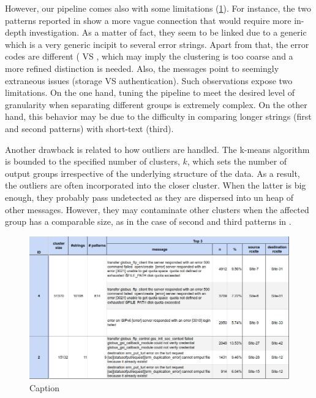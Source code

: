 However, our pipeline comes also with some limitations (\cref{fig:cluster_summary:failures}). 
For instance, the two patterns reported in  show a more vague connection that would require more in-depth investigation.
As a matter of fact, they seem to be linked due to a generic  which is a very generic incipit to several error strings. Apart from that, the error codes are different (\textbox{[3021]} VS \textbox{[3010]}, which may imply the clustering is too coarse and a more refined distinction is needed.
Also, the messages point to seemingly extraneous issues (storage VS authentication).
Such observations expose two limitations. On the one hand, tuning the pipeline to meet the desired level of granularity when separating different groups is extremely complex. 
On the other hand, this behavior may be due to the difficulty in comparing longer strings (first and second patterns) with short-text (third).

Another drawback is related to how outliers are handled. The k-means algorithm is bounded to the specified number of clusters, $k$, which sets the number of output groups irrespective of the underlying structure of the data.
As a result, the outliers are often incorporated into the closer cluster. When the latter is big enough, they probably pass undetected as they are dispersed into un heap of other messages. However, they may contaminate other clusters when the affected group has a comparable size, as in the case of second and third patterns in .

\begin{landscape}
\begin{figure}
    \centering
    \includegraphics[width=\linewidth]{figures/510_results/timeplots/table-failures.png}
    \caption{Caption}
    \label{fig:cluster_summary:failures}
\end{figure}
\end{landscape}